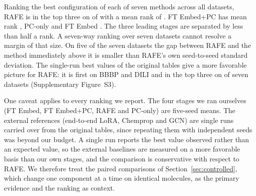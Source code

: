 \documentclass[pdflatex,sn-mathphys-num,Numbered]{sn-jnl}%
\begin{document}
Ranking the best configuration of each of seven methods across all \nds{} datasets, RAFE is in the top three on \ntop{} of \nds{} with a mean rank of \mrankRAFE{}. FT Embed+PC has mean rank \mrankFTPC{}, PC-only \mrankPC{} and FT Embed \mrankFT{}. The three leading stages are separated by less than half a rank. A seven-way ranking over seven datasets cannot resolve a margin of that size. On five of the seven datasets the gap between RAFE and the method immediately above it is smaller than RAFE's own seed-to-seed standard deviation. The single-run best values of the original tables give a more favorable picture for RAFE: it is first on BBBP and DILI and in the top three on \srtop{} of seven datasets (Supplementary Figure~S3).

One caveat applies to every ranking we report. The four stages we ran ourselves (FT Embed, FT Embed+PC, RAFE and PC-only) are five-seed means. The external references (end-to-end LoRA, Chemprop and GCN) are single runs carried over from the original tables, since repeating them with independent seeds was beyond our budget. A single run reports the best value observed rather than an expected value, so the external baselines are measured on a more favorable basis than our own stages, and the comparison is conservative with respect to RAFE. We therefore treat the paired comparisons of Section~\ref{sec:controlled}, which change one component at a time on identical molecules, as the primary evidence and the ranking as context.

\begin{table}[!ht]
\centering
\caption{Best configuration per dataset and stage, judged on five-seed test means (XGBoost and LightGBM). ``Single run'' is the best value of the same modality in the original tables. Table~\ref{tab:runnerup} gives the runner-up configuration of each row and the paired difference to it.}
\label{tab:best_configs}
\footnotesize

\end{table}

\begin{table}[!ht]
\centering
\caption{Runner-up configuration for each row of Table~\ref{tab:best_configs}, with the difference between the best and the runner-up configuration and its paired 95\% bootstrap interval. Bold marks the one row whose interval excludes zero.}
\label{tab:runnerup}
\footnotesize

\end{table}
\end{document}
